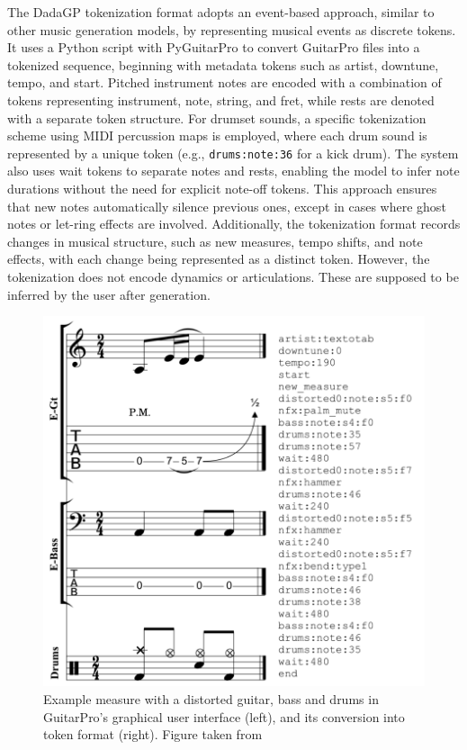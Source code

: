 The DadaGP tokenization format adopts an event-based approach, similar to other music generation models, by representing musical events as discrete tokens.
It uses a Python script with PyGuitarPro to convert GuitarPro files into a tokenized sequence, beginning with metadata tokens such as artist, downtune, tempo, and start.
Pitched instrument notes are encoded with a combination of tokens representing instrument, note, string, and fret, while rests are denoted with a separate token structure.
For drumset sounds, a specific tokenization scheme using MIDI percussion maps is employed, where each drum sound is represented by a unique token (e.g., \texttt{drums:note:36} for a kick drum).
The system also uses wait tokens to separate notes and rests, enabling the model to infer note durations without the need for explicit note-off tokens.
This approach ensures that new notes automatically silence previous ones, except in cases where ghost notes or let-ring effects are involved.
Additionally, the tokenization format records changes in musical structure, such as new measures, tempo shifts, and note effects, with each change being represented as a distinct token.
However, the tokenization does not encode dynamics or articulations. These are supposed to be inferred by the user after generation.


\begin{figure}[h!]
    \centering
    \includegraphics[width=.5\linewidth]{../images-figures/dadagp_tokenization_example_measure.png}
    \caption{Example measure with a distorted guitar, bass and drums in GuitarPro’s graphical user interface (left), and its conversion into token format (right). Figure taken from \cite{sarmento_dadagp_2021}}
    \label{fig:dadagp_tokenization}
\end{figure}


